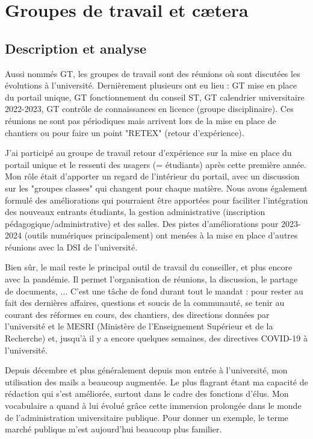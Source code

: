 \documentclass{article}
\begin{document}
\section{Groupes de travail et cætera}

\subsection{Description et analyse}
Aussi nommés GT, les groupes de travail sont des réunions où sont discutées les évolutions à l'université. Dernièrement plusieurs ont eu lieu : GT mise en place du portail unique, GT fonctionnement du conseil ST, GT calendrier  universitaire 2022-2023, GT contrôle de connaissances en licence (groupe disciplinaire). Ces réunions ne sont pas périodiques mais arrivent lors de la mise en place de chantiers ou pour faire un point "RETEX" (retour d'expérience).

J'ai participé au groupe de travail retour d'expérience sur la mise en place du portail unique et le ressenti des usagers (= étudiants) après cette première année. Mon rôle était d'apporter un regard de l'intérieur du portail, avec un discussion sur les "groupes classes" qui changent pour chaque matière. Nous avons également formulé des améliorations qui pourraient être apportées pour faciliter l'intégration des nouveaux entrants étudiants, la gestion administrative (inscription pédagogique/administrative) et des salles. Des pistes d'améliorations pour 2023-2024 (outils numériques principalement) ont menées à la mise en place d'autres réunions avec la DSI de l'université.

Bien sûr, le mail reste le principal outil de travail du conseiller, et plus encore avec la pandémie. Il permet l'organisation de réunions, la discussion, le partage de documents, ... C'est une tâche de fond durant tout le mandat : pour rester au fait des dernières affaires, questions et soucis de la communauté, se tenir au courant des réformes en cours, des chantiers, des directions données par l'université et le MESRI (Ministère de l'Enseignement Supérieur et de la Recherche) et, jusqu'à il y a encore quelques semaines, des directives COVID-19 à l'université.

Depuis décembre et plus généralement depuis mon entrée à l'université, mon utilisation des mails a beaucoup augmentée. Le plus flagrant étant ma capacité de rédaction qui s'est améliorée, surtout dans le cadre des fonctions d'élus. Mon vocabulaire a quand à lui évolué grâce cette immersion prolongée dans le monde de l'administration universitaire publique. Pour donner un exemple, le terme marché publique m'est aujourd'hui beaucoup plus familier. 
\end{document}
